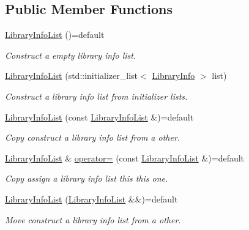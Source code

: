 \subsection*{Public Member Functions}
\begin{DoxyCompactItemize}
\item 
\hyperlink{class_mdt_1_1_deploy_utils_1_1_library_info_list_a3157bd9fc09a3472c1a0e2e615d619ea}{Library\+Info\+List} ()=default
\begin{DoxyCompactList}\small\item\em Construct a empty library info list. \end{DoxyCompactList}\item 
\hyperlink{class_mdt_1_1_deploy_utils_1_1_library_info_list_ad7855d64a98e84a8ae1cf71acf03dbc4}{Library\+Info\+List} (std\+::initializer\+\_\+list$<$ \hyperlink{class_mdt_1_1_deploy_utils_1_1_library_info}{Library\+Info} $>$ list)
\begin{DoxyCompactList}\small\item\em Construct a library info list from initializer lists. \end{DoxyCompactList}\item 
\hyperlink{class_mdt_1_1_deploy_utils_1_1_library_info_list_ab96b187fdc2f20b37aee8786018a4675}{Library\+Info\+List} (const \hyperlink{class_mdt_1_1_deploy_utils_1_1_library_info_list}{Library\+Info\+List} \&)=default
\begin{DoxyCompactList}\small\item\em Copy construct a library info list from a other. \end{DoxyCompactList}\item 
\hyperlink{class_mdt_1_1_deploy_utils_1_1_library_info_list}{Library\+Info\+List} \& \hyperlink{class_mdt_1_1_deploy_utils_1_1_library_info_list_a3f6c7292e77383705324a45b26c2240f}{operator=} (const \hyperlink{class_mdt_1_1_deploy_utils_1_1_library_info_list}{Library\+Info\+List} \&)=default
\begin{DoxyCompactList}\small\item\em Copy assign a library info list this this one. \end{DoxyCompactList}\item 
\hyperlink{class_mdt_1_1_deploy_utils_1_1_library_info_list_a81366014bcc6c3e6577e52bbe42f0893}{Library\+Info\+List} (\hyperlink{class_mdt_1_1_deploy_utils_1_1_library_info_list}{Library\+Info\+List} \&\&)=default
\begin{DoxyCompactList}\small\item\em Move construct a library info list from a other. \end{DoxyCompactList}\item 

\end{DoxyCompactItemize}
